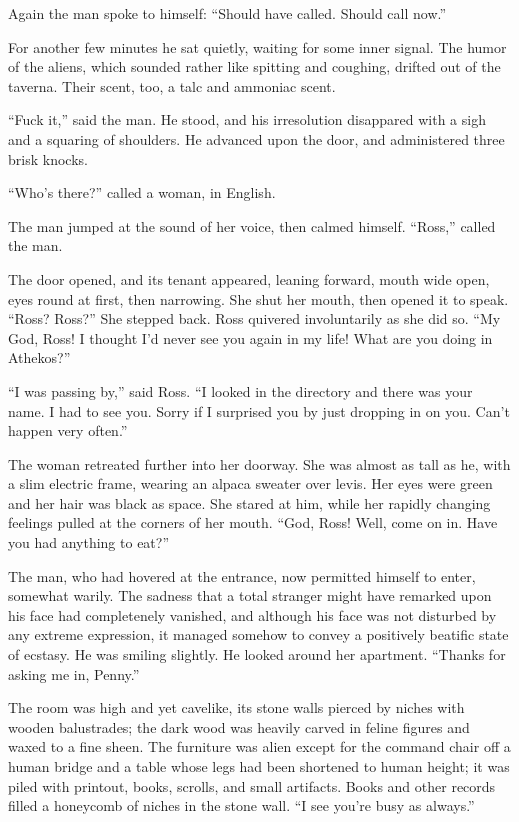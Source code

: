 \documentclass[english,11pt,letterpaper,onecolumn]{scrbook}
\begin{document}
	Again the man spoke to himself:  ``Should have called.  Should call now.''

	For another few minutes he sat quietly, waiting for some inner signal.  The humor of the aliens, which sounded rather like spitting and coughing, drifted out of the taverna.  Their scent, too, a talc and ammoniac scent.

	``Fuck it,'' said the man.  He stood, and his irresolution disappared with a sigh and a squaring of shoulders.  He advanced upon the door, and administered three brisk knocks.

	``Who's there?'' called a woman, in English.

	The man jumped at the sound of her voice, then calmed himself.  ``Ross,'' called the man.

	The door opened, and its tenant appeared, leaning forward, mouth wide open, eyes round at first, then narrowing.  She shut her mouth, then opened it to speak.  ``Ross?  Ross?''  She stepped back.  Ross quivered involuntarily as she did so.  ``My God, Ross!  I thought I'd never see you again in my life!  What are you doing in Athekos?''

	``I was passing by,'' said Ross.  ``I looked in the directory and there was your name.  I had to see you.  Sorry if I surprised you by just dropping in on you.  Can't happen very often.''

	The woman retreated further into her doorway.  She was almost as tall as he, with a slim electric frame, wearing an alpaca sweater over levis.  Her eyes were green and her hair was black as space.  She stared at him, while her rapidly changing feelings pulled at the corners of her mouth.  ``God, Ross!  Well, come on in.  Have you had anything to eat?''

	The man, who had hovered at the entrance, now permitted himself to enter, somewhat warily.  The sadness that a total stranger might have remarked upon his face had completenely vanished, and although his face was not disturbed by any extreme expression, it managed somehow to convey a positively beatific state of ecstasy.  He was smiling slightly.  He looked around her apartment.  ``Thanks for asking me in, Penny.''

	The room was high and yet cavelike, its stone walls pierced by niches with wooden balustrades; the dark wood was heavily carved in feline figures and waxed to a fine sheen.  The furniture was alien except for the command chair off a human bridge and a table whose legs had been shortened to human height; it was piled with printout, books, scrolls, and small artifacts.  Books and other records filled a honeycomb of niches in the stone wall.  ``I see you're busy as always.''
\end{document}
